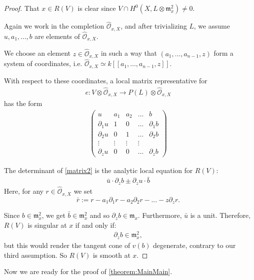 \documentclass[11pt,reqno]{amsart}
\theoremstyle{plain}
\theoremstyle{definition}
\theoremstyle{remark}
\numberwithin{equation}{section}
\newcommand{\cO}{{\mathcal O}}
\renewcommand{\to}{{\longrightarrow}}
\numberwithin{equation}{section}
\begin{document}
\begin{proof}
  That $x \in R(V)$ is clear since $V \cap H^{0}(X,L \otimes \mathfrak{m}^{2}_{x}) \neq 0 $.

  Again we work in the completion $\widehat{\cO}_{x,X}$, and after trivializing $L$, we assume $u, a_{1}, ..., b$ are elements of $\widehat{\cO}_{x,X}$. 

  We choose an element $z \in \widehat{\cO}_{x,X}$ in such a way that $(a_{1}, ..., a_{n-1}, z)$ form a system of coordinates, i.e. $\widehat{\cO}_{x,X} \simeq k[[a_{1}, ..., a_{n-1}, z ]]$.  

  With respect to these coordinates, a local matrix representative for \begin{align*}
  e: V \otimes \widehat{\cO}_{x,X} \to P(L) \otimes \widehat{\cO}_{x,X}
\end{align*}
has the form
\begin{align}\label{matrix2}
\begin{pmatrix}
  u & a_{1} & a_{2} & \dots & b \\
  \partial_{1}u & 1 & 0 & \dots & \partial_{1}b \\
  \partial_{2}u & 0 & 1 & \dots & \partial_{2}b \\
  \vdots & \vdots & \vdots & \vdots \\
  \partial_{z}u  & 0 & 0 & \dots & \partial_{z}b
\end{pmatrix}
\end{align}

The determinant of \ref{matrix2} is the analytic local equation for $R(V)$: 
\begin{align*}
   \bar{u} \cdot \partial_{z}b \pm \partial_{z}u \cdot \bar{b}
 \end{align*} 
 Here, for any $r \in \widehat{\cO}_{x,X}$ we set $$\bar{r} := r - a_{1}\partial_{1}r - a_{2}\partial_{2}r - ... - z \partial_{z} r.$$

 Since $b \in {\mathfrak m}^{2}_{x}$, we get $\bar{b} \in {\mathfrak m}^{2}_{x}$ and so $\partial_{z}b \in {\mathfrak m}_{x}$.  Furthermore, $\bar{u}$ is a unit.  Therefore,  $R(V)$ is singular at $x$ if and only if: 
 \begin{align*}
  \partial_{z}b \in {\mathfrak m}^{2}_{x},
 \end{align*}
 but this would render the tangent cone of $v(b)$ degenerate, contrary to our third assumption. So $R(V)$ is smooth at $x$.
\end{proof}

Now we are ready for the proof of \autoref{theorem:MainMain}. 
\end{document}
